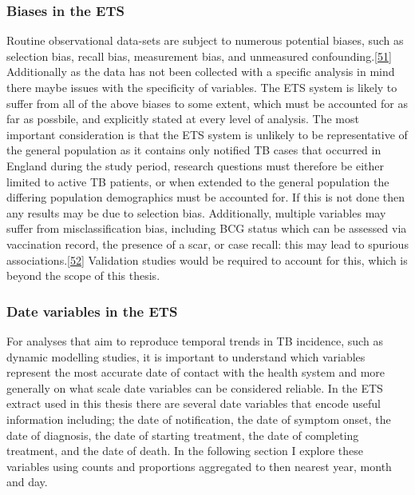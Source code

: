 \documentclass[11pt,twoside]{bristolthesis}
\begin{document}
  \hypertarget{biases-in-the-ets}{%
  \subsubsection{Biases in the ETS}\label{biases-in-the-ets}}
  
  Routine observational data-sets are subject to numerous potential biases, such as selection bias, recall bias, measurement bias, and unmeasured confounding.{[}\protect\hyperlink{ref-Benchimol2016a}{51}{]} Additionally as the data has not been collected with a specific analysis in mind there maybe issues with the specificity of variables. The ETS system is likely to suffer from all of the above biases to some extent, which must be accounted for as far as possbile, and explicitly stated at every level of analysis. The most important consideration is that the ETS system is unlikely to be representative of the general population as it contains only notified TB cases that occurred in England during the study period, research questions must therefore be either limited to active TB patients, or when extended to the general population the differing population demographics must be accounted for. If this is not done then any results may be due to selection bias. Additionally, multiple variables may suffer from misclassification bias, including BCG status which can be assessed via vaccination record, the presence of a scar, or case recall: this may lead to spurious associations.{[}\protect\hyperlink{ref-Fewell2007}{52}{]} Validation studies would be required to account for this, which is beyond the scope of this thesis.
  
  \hypertarget{date-variables-in-the-ets}{%
  \subsubsection{Date variables in the ETS}\label{date-variables-in-the-ets}}
  
  For analyses that aim to reproduce temporal trends in TB incidence, such as dynamic modelling studies, it is important to understand which variables represent the most accurate date of contact with the health system and more generally on what scale date variables can be considered reliable. In the ETS extract used in this thesis there are several date variables that encode useful information including; the date of notification, the date of symptom onset, the date of diagnosis, the date of starting treatment, the date of completing treatment, and the date of death. In the following section I explore these variables using counts and proportions aggregated to then nearest year, month and day.
  
\end{document}
